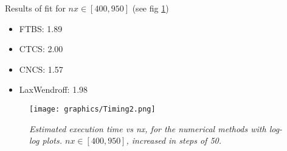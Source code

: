 Results of fit for $nx\in [400, 950]$ (see fig \ref{fig:timing2})
\begin{itemize}
\item FTBS: 1.89
\item CTCS: 2.00
\item CNCS: 1.57
\item LaxWendroff: 1.98
\end{itemize}

\begin{figure}[H]
	\begin{center}
		\texttt{[image: graphics/Timing2.png]}
	\end{center}%
	\caption[computational cost of numerical methods]{ \em Estimated execution time vs nx, for the numerical methods with log-log plots.  $nx\in [400, 950]$, increased in steps of 50.}
	\label{fig:timing2}
\end{figure}
